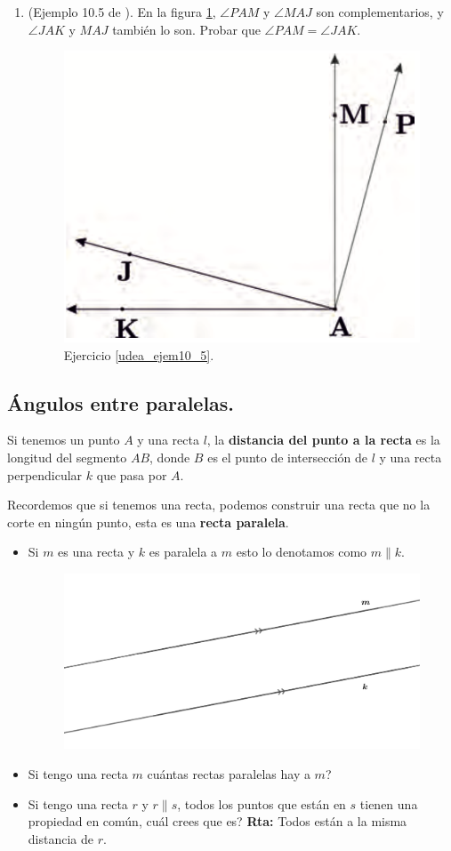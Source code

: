 \begin{enumerate}
	\item \label{udea_ejem10_5} (Ejemplo 10.5 de \cite{Udea_geometria}). En la figura \ref{udeaejemplo105},  $\angle PAM$ y $\angle 	MAJ$ son complementarios, y $\angle JAK$ y $MAJ$ también lo son. Probar que $\angle PAM = \angle JAK$.
	\begin{figure}[H]
		\centering
		\includegraphics[width=0.4\linewidth]{Geometria/imgs/udea_ejemplo_10_5}
		\caption{Ejercicio \ref{udea_ejem10_5}.}
		\label{udeaejemplo105}
	\end{figure}
	
\end{enumerate}

\newpage

\subsection{Ángulos entre paralelas.}\label{subsection_angulos_entre_paralelas}
Si tenemos un punto $A$ y una recta $l$, la \textbf{distancia del punto a la recta} es la longitud del segmento $AB$, donde $B$ es el punto de intersección de $l$ y una recta perpendicular $k$ que pasa por $A$. 

Recordemos que si tenemos una recta, podemos construir una recta que no la corte en ningún punto, esta es una \textbf{recta paralela}.  

\begin{itemize}
	\item Si $m$ es una recta y $k$ es paralela a $m$ esto lo denotamos como $m\parallel k$.
	\begin{figure}[H]
		\centering
		\includegraphics[width=0.7\linewidth]{Geometria/imgs/paralelas}
		\caption{}
		\label{paralelas_con_notacion}
	\end{figure}
	\item Si tengo una recta $m$ cuántas rectas paralelas hay a $m$?
	\item Si tengo una recta $r$ y $r\parallel s$, todos los puntos que están en $s$ tienen una propiedad en común, cuál crees que es? \textbf{Rta: }Todos están a la misma distancia de $r$.
\end{itemize}

